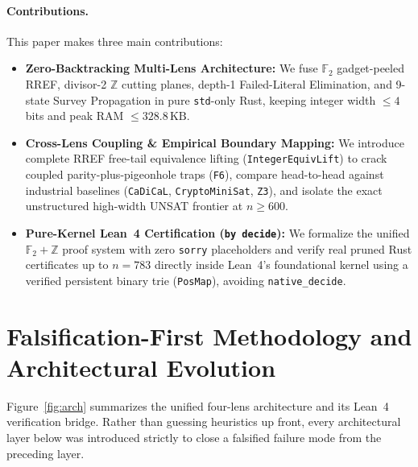 \documentclass[11pt]{article}
\begin{document}
\paragraph{Contributions.} This paper makes three main contributions:
\begin{itemize}
  \item \textbf{Zero-Backtracking Multi-Lens Architecture:} We fuse $\mathbb{F}_2$ gadget-peeled RREF, divisor-2 $\mathbb{Z}$ cutting planes, depth-1 Failed-Literal Elimination, and 9-state Survey Propagation in pure \texttt{std}-only Rust, keeping integer width $\le 4$ bits and peak RAM $\le 328.8\,\text{KB}$.
  \item \textbf{Cross-Lens Coupling \& Empirical Boundary Mapping:} We introduce complete RREF free-tail equivalence lifting (\texttt{IntegerEquivLift}) to crack coupled parity-plus-pigeonhole traps (\texttt{F6}), compare head-to-head against industrial baselines (\texttt{CaDiCaL}, \texttt{CryptoMiniSat}, \texttt{Z3}), and isolate the exact unstructured high-width UNSAT frontier at $n \ge 600$.
  \item \textbf{Pure-Kernel Lean~4 Certification (\texttt{by decide}):} We formalize the unified $\mathbb{F}_2 + \mathbb{Z}$ proof system with zero \texttt{sorry} placeholders and verify real pruned Rust certificates up to $n = 783$ directly inside Lean~4's foundational kernel using a verified persistent binary trie (\texttt{PosMap}), avoiding \texttt{native\_decide}.
\end{itemize}

\section{Falsification-First Methodology and Architectural Evolution}

Figure~\ref{fig:arch} summarizes the unified four-lens architecture and its Lean~4 verification bridge. Rather than guessing heuristics up front, every architectural layer below was introduced strictly to close a falsified failure mode from the preceding layer.
\end{document}
